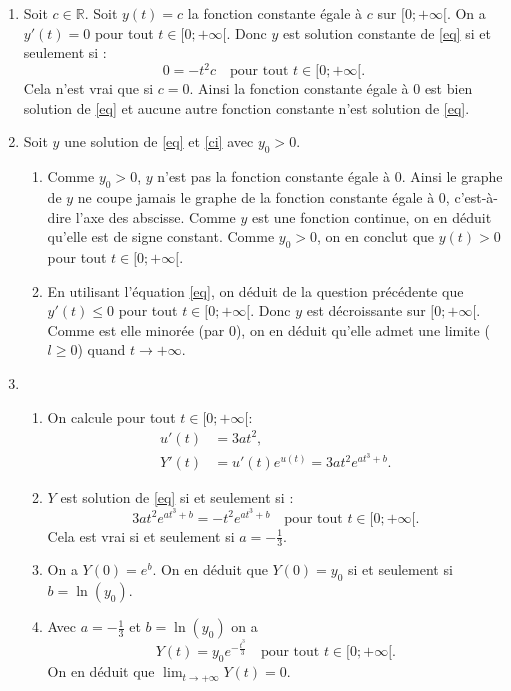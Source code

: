 \documentclass[11pt,class=report,crop=false]{standalone}
\begin{document}
\sauteligne
\begin{enumerate}
  \item Soit $c \in \mathbb{R}$.
  Soit $y(t)=c$ la fonction constante égale à $c$ sur $[0; +\infty[$.
  On a $y'(t)=0$ pour tout $t \in [0; +\infty[$.
  Donc $y$ est solution constante de \eqref{eq} si et seulement si :
  \begin{equation*}
  0 = -t^2 c \quad \text{pour tout $t \in [0; +\infty[$.}
  \end{equation*}
  Cela n'est vrai que si $c=0$.
  Ainsi la fonction constante égale à $0$ est bien solution de \eqref{eq} et aucune autre fonction constante n'est solution de \eqref{eq}.
  
  \item Soit $y$ une solution de \eqref{eq} et \eqref{ci} avec $y_0>0$.
  \begin{enumerate}
    \item Comme $y_0>0$, $y$ n'est pas la fonction constante égale à $0$.
    Ainsi le graphe de $y$ ne coupe jamais le graphe de la fonction constante égale à $0$, c'est-à-dire l'axe des abscisse.
    Comme $y$ est une fonction continue, on en déduit qu'elle est de signe constant.
    Comme $y_0>0$, on en conclut que $y(t)>0$ pour tout $t \in [0; +\infty[$.
    \item En utilisant l'équation \eqref{eq}, on déduit de la question précédente que $y'(t)\le0$ pour tout $t \in [0; +\infty[$.
    Donc $y$ est décroissante sur $[0; +\infty[$.
    Comme est elle minorée (par $0$), on en déduit qu'elle admet une limite ($l \geq 0$) quand $t \to +\infty$.
  \end{enumerate}
  \item
  \begin{enumerate}
    \item On calcule pour tout $t \in [0; +\infty[$:
    \begin{align*}
      u'(t) &= 3at^2, \\
      Y'(t) &= u'(t) e^{u(t)} = 3at^2 e^{at^3+b}.
    \end{align*}
    \item $Y$ est solution de \eqref{eq} si et seulement si :
    \begin{equation*}
    3at^2 e^{at^3+b} = -t^2 e^{at^3+b} \quad \text{pour tout $t \in [0; +\infty[$.}
    \end{equation*}
    Cela est vrai si et seulement si $a=-\frac13$.
    \item On a $Y(0) = e^b$.
    On en déduit que $Y(0) = y_0$ si et seulement si $b=\ln(y_0)$.
    \item Avec $a=-\frac13$ et $b=\ln(y_0)$ on a
    \begin{equation*}
    Y(t) = y_0e^{-\frac{t^3}3} \quad \text{pour tout $t \in [0; +\infty[$.}
    \end{equation*}
    On en déduit que $\lim_{t \to +\infty} Y(t) = 0$.
  \end{enumerate}
\end{enumerate}
\fincorrection
\finexercice
\end{document}
